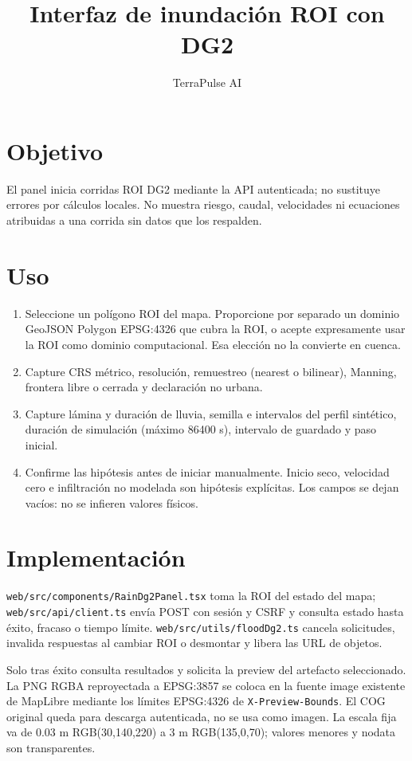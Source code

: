 \documentclass{article}
\begin{document}
\title{Interfaz de inundación ROI con DG2}
\author{TerraPulse AI}
\maketitle

\section{Objetivo}
El panel inicia corridas ROI DG2 mediante la API autenticada; no sustituye errores por cálculos locales. No muestra riesgo, caudal, velocidades ni ecuaciones atribuidas a una corrida sin datos que los respalden.

\section{Uso}
\begin{enumerate}
\item Seleccione un polígono ROI del mapa. Proporcione por separado un dominio GeoJSON Polygon EPSG:4326 que cubra la ROI, o acepte expresamente usar la ROI como dominio computacional. Esa elección no la convierte en cuenca.
\item Capture CRS métrico, resolución, remuestreo (nearest o bilinear), Manning, frontera libre o cerrada y declaración no urbana.
\item Capture lámina y duración de lluvia, semilla e intervalos del perfil sintético, duración de simulación (máximo 86400 s), intervalo de guardado y paso inicial.
\item Confirme las hipótesis antes de iniciar manualmente. Inicio seco, velocidad cero e infiltración no modelada son hipótesis explícitas. Los campos se dejan vacíos: no se infieren valores físicos.
\end{enumerate}

\section{Implementación}
\texttt{web/src/components/RainDg2Panel.tsx} toma la ROI del estado del mapa; \texttt{web/src/api/client.ts} envía POST con sesión y CSRF y consulta estado hasta éxito, fracaso o tiempo límite. \texttt{web/src/utils/floodDg2.ts} cancela solicitudes, invalida respuestas al cambiar ROI o desmontar y libera las URL de objetos.

Solo tras éxito consulta resultados y solicita la preview del artefacto seleccionado. La PNG RGBA reproyectada a EPSG:3857 se coloca en la fuente image existente de MapLibre mediante los límites EPSG:4326 de \texttt{X-Preview-Bounds}. El COG original queda para descarga autenticada, no se usa como imagen. La escala fija va de 0.03 m RGB(30,140,220) a 3 m RGB(135,0,70); valores menores y nodata son transparentes.
\end{document}
